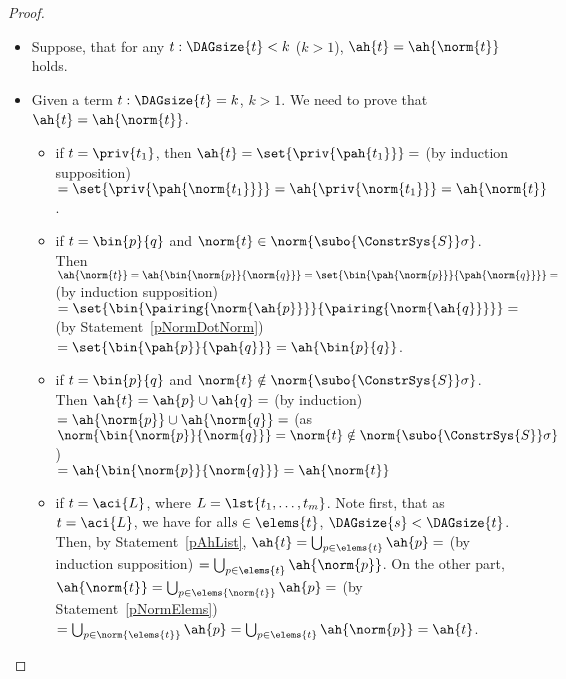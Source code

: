 \begin{lemma}
{\begin{proof}
\begin{description}
\begin{itemize}
	  \item Suppose, that for any $t: \DAGsize{t} < k$ ($k>1$), ${\ah{t}}=\ah{\norm{t}}$ holds.
	  \item Given a term  $t: \DAGsize{t}=k$, $k>1$. We need to prove that ${\ah{t}}=\ah{\norm{t}}$.
		  \begin{itemize}
		  \item if $t=\priv{t_1}$, then ${\ah{t}}=\set{\priv{\pah{t_1}}}=$ (by induction supposition) 
		  $=\set{\priv{\pah{\norm{t_1}}}}=\ah{\priv{\norm{t_1}}}= \ah{\norm{t}}$.
		  \item if $t=\bin{p}{q}$ and $\norm{t}\in \norm{\subo{\ConstrSys{S}}\sigma}$.
			Then $\ah{\norm{t}} = \ah{\bin{\norm{p}}{\norm{q}}}=\set{\bin{\pah{\norm{p}}}{\pah{\norm{q}}}} = $
			(by induction supposition) $=\set{\bin{\pairing{\norm{\ah{p}}}}{\pairing{\norm{\ah{q}}}}}=$ (by Statement~\ref{pNormDotNorm}) 
			$=\set{\bin{\pah{p}}{\pah{q}}}={\ah{\bin{p}{q}}}$.
		  \item if $t=\bin{p}{q}$ and $\norm{t}\notin \norm{\subo{\ConstrSys{S}}\sigma}$.
			Then ${\ah{t}} = {\ah{p}}\cup{\ah{q}} = $ (by induction) $=\ah{\norm{p}}\cup\ah{\norm{q}} = $
			(as $\norm{\bin{\norm{p}}{\norm{q}}}=\norm{t}\notin \norm{\subo{\ConstrSys{S}}\sigma}$) \\ $=\ah{\bin{\norm{p}}{\norm{q}}}=\ah{\norm{t}}$ 
		  \item if $t=\aci{L}$, where $L=\lst{t_1,\dots,t_m}$.
			Note first, that as $t=\aci{L}$, we have for all$s \in \elems{t}$, $\DAGsize{s} < \DAGsize{t}$.
			Then, by Statement~\ref{pAhList}, $\ah{t} = \bigcup_{p\in\elems{t}}\ah{p} = $ (by induction supposition) $=\bigcup_{p\in\elems{t}}\ah{\norm{p}}$.
			On the other part, $\ah{\norm{t}} = \bigcup_{p\in\elems{\norm{t}}}\ah{p} =$  (by Statement~\ref{pNormElems}) $=\bigcup_{p\in\norm{\elems{t}}}\ah{p} =
			\bigcup_{p\in\elems{t}}\ah{\norm{p}}=\ah{t}$.
\end{itemize}


\end{itemize}
\end{description}
\end{proof}}
\end{lemma}
